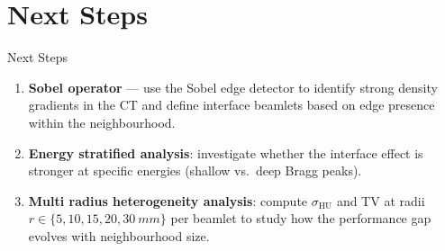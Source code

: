 \documentclass[aspectratio=169, 10pt]{beamer}
\begin{document}
\section{Next Steps}

\begin{frame}{Next Steps}
  \begin{enumerate}
    \item \textbf{Sobel operator} — use the Sobel edge detector to
          identify strong density gradients in the CT and define
          interface beamlets based on edge presence within the
          neighbourhood.
    \item \textbf{Energy stratified analysis}: investigate whether the
          interface effect is stronger at specific energies (shallow
          vs.\ deep Bragg peaks).
    \item \textbf{Multi radius heterogeneity analysis}: compute
          $\sigma_{\text{HU}}$ and TV at radii $r \in \{5, 10, 15, 20,
          \SI{30}{mm}\}$ per beamlet to study how the performance gap
          evolves with neighbourhood size.
  \end{enumerate}
\end{frame}
\end{document}
